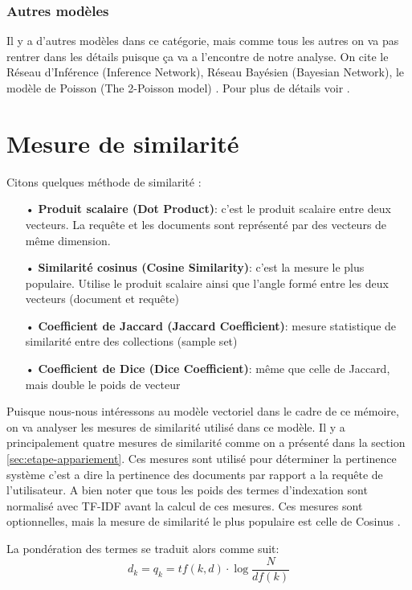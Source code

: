 \subsubsection{Autres modèles}
Il y a d'autres modèles dans ce catégorie, mais comme tous les autres on va pas rentrer dans les détails puisque ça va a l’encontre de notre analyse. On cite le Réseau d'Inférence (Inference Network), Réseau Bayésien (Bayesian Network), le modèle de Poisson (The 2-Poisson model) \citep{model-ir}. Pour plus de détails voir \citep{modern-ir}.

\section{Mesure de similarité}
\label{sec:mesure-similarite}
Citons quelques méthode de similarité \citep*{vsm-for-arabic-language, sarch-engine-vsm, vsm}:
\begin{itemize}
    \item[•] \textbf{Produit scalaire (Dot Product)}: c'est le produit scalaire entre deux vecteurs. La requête et les documents sont représenté par des vecteurs de même dimension.
    \item[•] \textbf{Similarité cosinus (Cosine Similarity)}: c'est la mesure le plus populaire. Utilise le produit scalaire ainsi que l'angle formé entre les deux vecteurs (document et requête)
    \item[•] \textbf{Coefficient de Jaccard (Jaccard Coefficient)}: mesure statistique de similarité entre des collections (sample set)
    \item[•] \textbf{Coefficient de Dice (Dice Coefficient)}: même que celle de Jaccard, mais double le poids de vecteur
\end{itemize}

Puisque nous-nous intéressons au modèle vectoriel dans le cadre de ce mémoire, on va analyser les mesures de similarité utilisé dans ce modèle. Il y a principalement quatre mesures de similarité comme on a présenté dans la section \ref{sec:etape-appariement}. Ces mesures sont utilisé pour déterminer la pertinence système c'est a dire la pertinence des documents par rapport a la requête de l'utilisateur. A bien noter que tous les poids des termes d'indexation sont normalisé avec TF-IDF avant la calcul de ces mesures. Ces mesures sont optionnelles, mais la mesure de similarité le plus populaire est celle de Cosinus \citep{vsm}.

La pondération des termes se traduit alors comme suit:
\[
    d_{k} = q_{k} = tf(k, d) \cdot \log{\frac{N}{df{(k)}}}
\]

